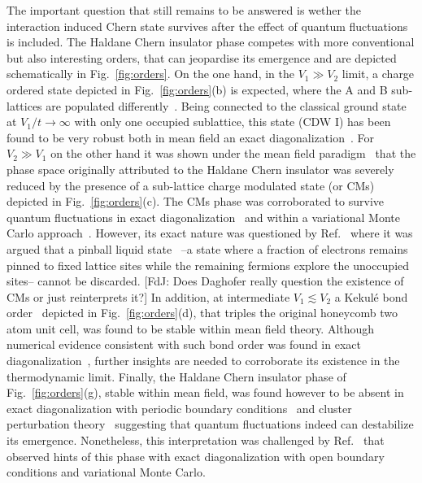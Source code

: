 \documentclass[aps,prx,10pt,twocolumn,floatfix,superscriptaddress,showpacs,numerical,footinbib]{revtex4-1}
\newcommand{\noteFdJ}[1]{{\color{cyan} [FdJ: #1]}}
\begin{document}
The important question that still remains to be answered is wether the interaction induced Chern state survives 
after the effect of quantum fluctuations is included.
%
The Haldane Chern insulator phase competes with more conventional but also interesting orders, 
that can jeopardise its emergence and are depicted schematically in Fig.~\ref{fig:orders}.
%
On the one hand, in the $V_{1} \gg V_{2}$ limit, a charge ordered state depicted in Fig.~\ref{fig:orders}(b) is expected, 
where the A and B sub-lattices are populated differently~\cite{RQHZ08,WCT14}.
%
Being connected to the classical ground state at $V_{1}/t \to \infty$ with only one occupied sublattice, this state (CDW I) has been found to be very robust both in mean field an exact diagonalization~\cite{GGNVC13,DH14}.
%
For $V_{2}\gg V_{1}$ on the other hand it was shown under the mean field paradigm~\cite{GCC13} that the phase space originally attributed to the Haldane Chern insulator 
was severely reduced by the presence of a sub-lattice charge modulated state (or CMs) depicted in Fig.~\ref{fig:orders}(c).
%
The CMs phase was corroborated to survive quantum fluctuations in exact diagonalization~\cite{GGNVC13,DCH14} and within a variational Monte Carlo approach~\cite{DCH14}.
%
However, its exact nature was questioned by Ref.~\cite{DH14} where it was argued that a pinball liquid state~\cite{HF06,MRF13} --a state where a fraction of electrons remains pinned to fixed lattice sites while the remaining fermions explore the unoccupied sites-- cannot be discarded. \noteFdJ{Does Daghofer really question the existence of CMs or just reinterprets it?}
%
In addition, at intermediate $V_{1}\lesssim V_{2}$ a Kekul\'e bond order~\cite{C00,HCM07,WF10,RH10,RJH13} depicted in Fig.~\ref{fig:orders}(d), that triples the original honeycomb two atom unit cell, 
was found to be stable within mean field theory.
%
Although numerical evidence consistent with such bond order was found in exact diagonalization~\cite{GGNVC13}, further insights are needed to corroborate its existence in the thermodynamic limit.
%
Finally, the Haldane Chern insulator phase of Fig.~\ref{fig:orders}(g), stable within mean field, was found however to be absent in exact diagonalization with periodic boundary conditions~\cite{GGNVC13,DH14} and cluster perturbation theory~\cite{DH14} suggesting that quantum fluctuations indeed can destabilize its emergence.
%
Nonetheless, this interpretation was challenged by Ref.~\cite{DCH14} that observed hints of this phase with exact diagonalization with open boundary conditions and variational Monte Carlo.\\
\end{document}
